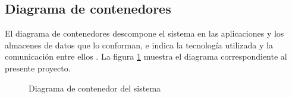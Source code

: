 \subsection{Diagrama de contenedores}
El diagrama de contenedores descompone el sistema en las aplicaciones y los almacenes de datos que lo conforman, e indica la tecnología utilizada y la comunicación entre ellos \cite{brown_software_architecture}. La figura \ref{fig:diagrama_contenedor} muestra el diagrama correspondiente al presente proyecto.
\begin{figure}
    \centering
    
    \caption{Diagrama de contenedor del sistema}
    \label{fig:diagrama_contenedor}
\end{figure}

\clearpage
\restoregeometry